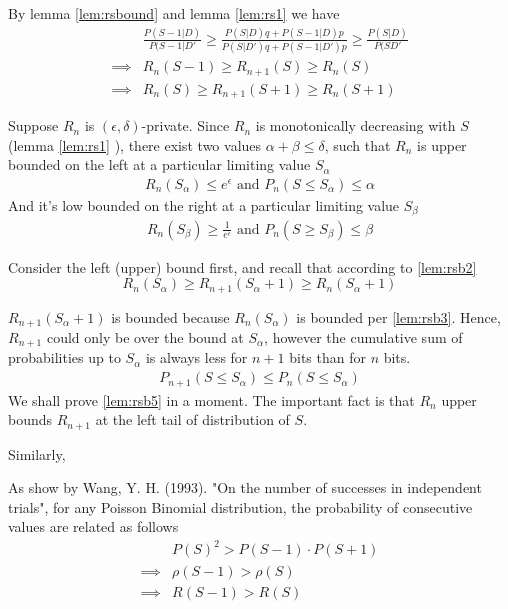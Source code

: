 \documentclass[11pt]{article}
\begin{document}
By lemma \eqref{lem:rsbound} and lemma  \eqref{lem:rs1} we have
\begin{align}
 & \frac{P(S-1|D)}{P(S-1|D'} \ge  \frac { P(S|D)q + P(S-1|D)p } { P(S|D')q + P(S-1|D')p} \ge \frac{P(S|D)}{P(SD'} \\
\implies & R_n(S-1) \ge R_{n+1}(S) \ge R_n(S) \\
\implies & R_n(S) \ge R_{n+1}(S+1) \ge R_n(S+1) \label{lem:rsb2}
\end{align}
 
Suppose $R_n$ is $(\epsilon, \delta)$-private. Since $R_n$ is monotonically decreasing with $S$ (lemma  \eqref{lem:rs1} ), there exist two values $\alpha + \beta \le \delta$, such that $R_n$ is upper bounded on the left at a particular limiting value $S_\alpha$ 
 \begin{align}  \label{lem:rsb3}
 R_n(S_\alpha) \le e^\epsilon \text{ and } P_n(S \le S_\alpha) \le \alpha 
\end{align}
And it's low bounded on the right at a particular limiting value $S_\beta$
 \begin{align}  \label{lem:rsb4}
 R_n(S_\beta) \ge \frac{1}{e^\epsilon} \text{ and } P_n(S \ge S_\beta) \le \beta
\end{align}
 
Consider the left (upper) bound first, and recall that according to \eqref{lem:rsb2}
\[
 R_n(S_\alpha) \ge R_{n+1}(S_\alpha+1) \ge R_n(S_\alpha+1)
 \]
 
$R_{n+1}(S_\alpha+1)$ is bounded because  $R_n(S_\alpha)$ is bounded per \eqref{lem:rsb3}.  Hence, $R_{n+1}$ could only be over the bound at $S_\alpha$, however the cumulative sum of probabilities up to $S_\alpha$ is always less for $n+1$ bits than for $n$ bits.
 \begin{align}  \label{lem:rsb5}
P_{n+1}(S \le S_\alpha) \le P_{n}(S \le S_\alpha)
\end{align}
We shall prove \eqref{lem:rsb5} in a moment. The important fact is that $R_n$ upper bounds $R_{n+1}$ at the left tail of distribution of $S$. 

Similarly, 
 
 
 As show by Wang, Y. H. (1993). "On the number of successes in independent trials", for any Poisson Binomial distribution, the probability of consecutive values are related as follows
 \begin{align*}
 & P(S)^2  > P(S-1) \cdot P(S+1) \\
\implies &  \rho(S-1) > \rho(S) \\
\implies & R(S-1) > R(S)
\end{align*}
\end{document}
